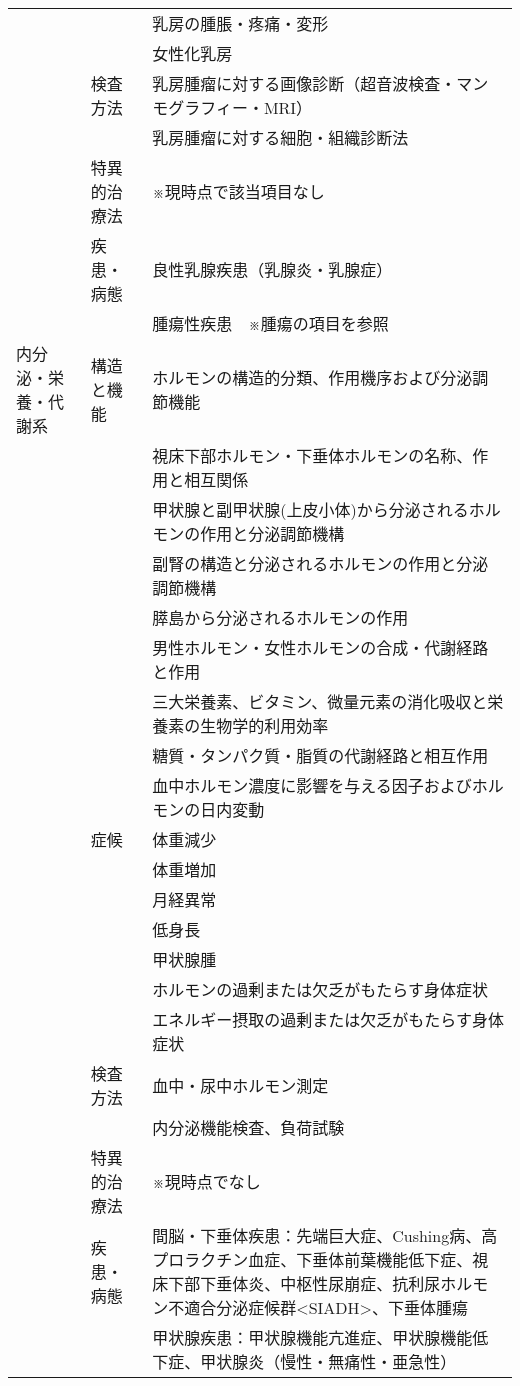 \begin{xltabular}{\linewidth}{XXX}
 &  & 乳房の腫脹・疼痛・変形 \\
 &  & 女性化乳房 \\
 & 検査方法 & 乳房腫瘤に対する画像診断（超音波検査・マンモグラフィー・MRI） \\
 &  & 乳房腫瘤に対する細胞・組織診断法 \\
 & 特異的治療法 & ※現時点で該当項目なし \\
 & 疾患・病態 & 良性乳腺疾患（乳腺炎・乳腺症） \\
 &  & 腫瘍性疾患　※腫瘍の項目を参照 \\
内分泌・栄養・代謝系 & 構造と機能 & ホルモンの構造的分類、作用機序および分泌調節機能 \\
 &  & 視床下部ホルモン・下垂体ホルモンの名称、作用と相互関係 \\
 &  & 甲状腺と副甲状腺(上皮小体)から分泌されるホルモンの作用と分泌調節機構 \\
 &  & 副腎の構造と分泌されるホルモンの作用と分泌調節機構 \\
 &  & 膵島から分泌されるホルモンの作用 \\
 &  & 男性ホルモン・女性ホルモンの合成・代謝経路と作用 \\
 &  & 三大栄養素、ビタミン、微量元素の消化吸収と栄養素の生物学的利用効率 \\
 &  & 糖質・タンパク質・脂質の代謝経路と相互作用 \\
 &  & 血中ホルモン濃度に影響を与える因子およびホルモンの日内変動 \\
 & 症候 & 体重減少 \\
 &  & 体重増加 \\
 &  & 月経異常 \\
 &  & 低身長 \\
 &  & 甲状腺腫 \\
 &  & ホルモンの過剰または欠乏がもたらす身体症状 \\
 &  & エネルギー摂取の過剰または欠乏がもたらす身体症状 \\
 & 検査方法 & 血中・尿中ホルモン測定 \\
 &  & 内分泌機能検査、負荷試験 \\
 & 特異的治療法 & ※現時点でなし \\
 & 疾患・病態 & 間脳・下垂体疾患：先端巨大症、Cushing病、高プロラクチン血症、下垂体前葉機能低下症、視床下部下垂体炎、中枢性尿崩症、抗利尿ホルモン不適合分泌症候群<SIADH>、下垂体腫瘍 \\
 &  & 甲状腺疾患：甲状腺機能亢進症、甲状腺機能低下症、甲状腺炎（慢性・無痛性・亜急性） \\

\end{xltabular}
